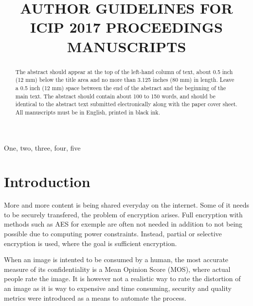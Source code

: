 \documentclass{article}
\title{AUTHOR GUIDELINES FOR ICIP 2017 PROCEEDINGS MANUSCRIPTS}
\begin{document}
%
\maketitle
%
\begin{abstract}
The abstract should appear at the top of the left-hand column of text, about
0.5 inch (12 mm) below the title area and no more than 3.125 inches (80 mm) in
length.  Leave a 0.5 inch (12 mm) space between the end of the abstract and the
beginning of the main text.  The abstract should contain about 100 to 150
words, and should be identical to the abstract text submitted electronically
along with the paper cover sheet.  All manuscripts must be in English, printed
in black ink.
\end{abstract}
%
\begin{keywords}
One, two, three, four, five
\end{keywords}
%
\section{Introduction}
\label{sec:intro}
More and more content is being shared everyday on the internet. Some of it needs to be securely transfered, the problem of encryption arises. Full encryption with methods such as AES for exemple are often not needed in addition to not being possible due to computing power constraints. Instead, partial or selective encryption is used, where the goal is sufficient encryption. %

When an image is intented to be consumed by a human, the most accurate measure of its confidentiality is a Mean Opinion Score (MOS), where actual people rate the image. It is however not a realistic way to rate the distortion of an image as it is way to expensive and time consuming, security and quality metrics were introduced as a means to automate the process.
\end{document}
